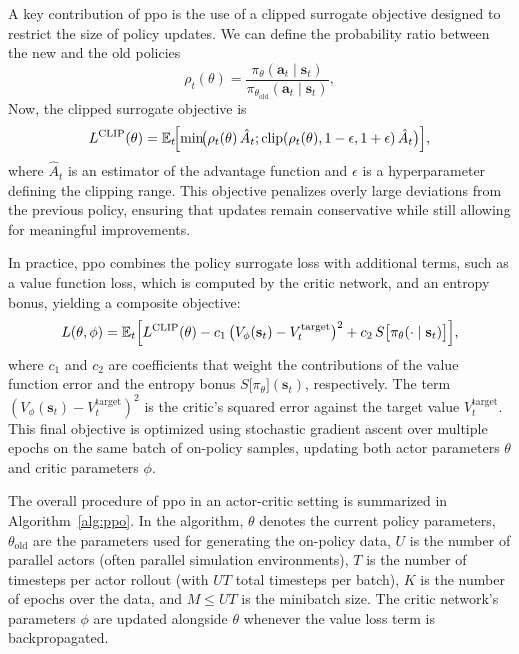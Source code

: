 A key contribution of \gls{ppo} is the use of a clipped surrogate objective designed to restrict the size of policy updates. We can define the probability ratio between the new and the old policies
\begin{equation}
\rho_t(\theta) = \frac{\pi_\theta(\mathbf{a}_t\mid \mathbf{s}_t)}{\pi_{\theta_{\text{old}}}(\mathbf{a}_t\mid \mathbf{s}_t)},
\end{equation}
Now, the clipped surrogate objective is
\begin{equation}
L^{\text{CLIP}}(\theta) = \mathbb{E}_t\!\Bigl[\min\!\bigl(\rho_t(\theta)\,\hat{A}_t;\text{clip}(\rho_t(\theta),1-\epsilon,1+\epsilon)\,\hat{A}_t\bigr)\Bigr],
\end{equation}
where \(\hat{A}_t\) is an estimator of the advantage function and \(\epsilon\) is a hyperparameter defining the clipping range. This objective penalizes overly large deviations from the previous policy, ensuring that updates remain conservative while still allowing for meaningful improvements.

In practice, \gls{ppo} combines the policy surrogate loss with additional terms, such as a value function loss, which is computed by the critic network, and an entropy bonus, yielding a composite objective:
\begin{equation}
L(\theta,\phi) = \mathbb{E}_t\Bigl[L^{\text{CLIP}}(\theta)
  - c_1\,\bigl(V_\phi(\mathbf{s}_t) - V_t^{\text{target}}\bigr)^2
  + c_2\,S\bigl[\pi_\theta(\cdot\mid \mathbf{s}_t)\bigr]\Bigr],
\end{equation}
where \(c_1\) and \(c_2\) are coefficients that weight the contributions of the value function error and the entropy bonus \(S\big[\pi_\theta\big](\mathbf{s}_t)\), respectively. The term \(\left(V_\phi(\mathbf{s}_t) - V_t^{\text{target}}\right)^2\) is the critic's squared error against the target value \(V_t^{\text{target}}\). This final objective is optimized using stochastic gradient ascent over multiple epochs on the same batch of on-policy samples, updating both actor parameters \(\theta\) and critic parameters \(\phi\).

The overall procedure of \gls{ppo} in an actor-critic setting is summarized in Algorithm~\ref{alg:ppo}. In the algorithm, \(\theta\) denotes the current policy parameters, \(\theta_{\text{old}}\) are the parameters used for generating the on-policy data, \(U\) is the number of parallel actors (often parallel simulation environments), \(T\) is the number of timesteps per actor rollout (with \(UT\) total timesteps per batch), \(K\) is the number of epochs over the data, and \(M \le UT\) is the minibatch size. The critic network's parameters \(\phi\) are updated alongside \(\theta\) whenever the value loss term is backpropagated.

